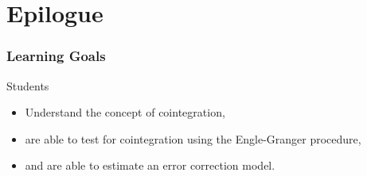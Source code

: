 \section{Epilogue}
\begin{frame}
\frametitle{Learning Goals}
Students
\begin{itemize}
\item Understand the concept of cointegration,
\item are able to test for cointegration using the Engle-Granger procedure,
\item and are able to estimate an error correction model.
\end{itemize}
\end{frame}

